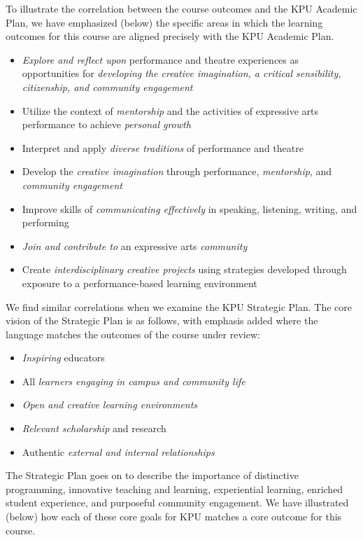 \documentclass[letterpaper,10pt,headsepline]{scrreprt}
\begin{document}
To illustrate the correlation between the course outcomes and the KPU
Academic Plan, we have emphasized (below) the specific areas in which
the learning outcomes for this course are aligned precisely with the KPU
Academic Plan.

\begin{itemize}
\item
  \emph{Explore and reflect upon} performance and theatre experiences as
  opportunities for \emph{developing the creative imagination, a
  critical sensibility, citizenship, and community engagement}
\item
  Utilize the context of \emph{mentorship} and the activities of
  expressive arts performance to achieve \emph{personal growth}
\item
  Interpret and apply \emph{diverse traditions} of performance and
  theatre
\item
  Develop the \emph{creative imagination} through performance,
  \emph{mentorship}, and \emph{community engagement}
\item
  Improve skills of \emph{communicating effectively} in speaking,
  listening, writing, and performing
\item
  \emph{Join and contribute to} an expressive arts \emph{community}
\item
  Create \emph{interdisciplinary creative projects} using strategies
  developed through exposure to a performance-based learning environment
\end{itemize}

We find similar correlations when we examine the KPU Strategic Plan. The
core vision of the Strategic Plan is as follows, with emphasis added
where the language matches the outcomes of the course under review:

\begin{itemize}
\item
  \emph{Inspiring} educators
\item
  All \emph{learners engaging in campus and community life}
\item
  \emph{Open and creative learning environments}
\item
  \emph{Relevant scholarship} and research
\item
  Authentic \emph{external and internal relationships}
\end{itemize}

The Strategic Plan goes on to describe the importance of distinctive
programming, innovative teaching and learning, experiential learning,
enriched student experience, and purposeful community engagement. We
have illustrated (below) how each of these core goals for KPU matches a
core outcome for this course.
\end{document}
